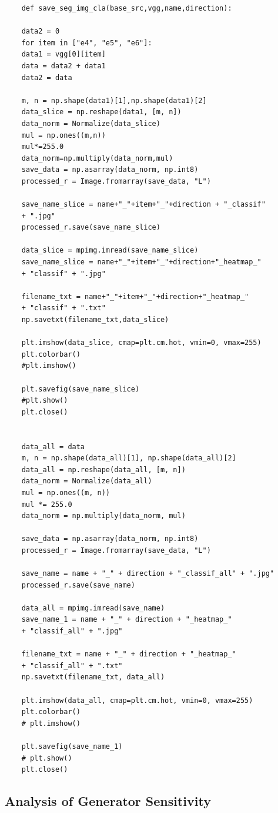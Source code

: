 \documentclass[a4paper]{article}
\begin{document}
	\lstset{language=python}
	\begin{lstlisting}
	def save_seg_img_cla(base_src,vgg,name,direction):
	
	data2 = 0
	for item in ["e4", "e5", "e6"]:  
	data1 = vgg[0][item]
	data = data2 + data1             	
	data2 = data
	
	m, n = np.shape(data1)[1],np.shape(data1)[2]
	data_slice = np.reshape(data1, [m, n])
	data_norm = Normalize(data_slice)
	mul = np.ones((m,n))
	mul*=255.0
	data_norm=np.multiply(data_norm,mul)
	save_data = np.asarray(data_norm, np.int8)
	processed_r = Image.fromarray(save_data, "L")
	
	save_name_slice = name+"_"+item+"_"+direction + "_classif" 
	+ ".jpg"
	processed_r.save(save_name_slice)
	
	data_slice = mpimg.imread(save_name_slice)
	save_name_slice = name+"_"+item+"_"+direction+"_heatmap_" 
	+ "classif" + ".jpg"
	
	filename_txt = name+"_"+item+"_"+direction+"_heatmap_" 
	+ "classif" + ".txt"
	np.savetxt(filename_txt,data_slice)
	
	plt.imshow(data_slice, cmap=plt.cm.hot, vmin=0, vmax=255)
	plt.colorbar()
	#plt.imshow()
	
	plt.savefig(save_name_slice)
	#plt.show()
	plt.close()
	

	data_all = data
	m, n = np.shape(data_all)[1], np.shape(data_all)[2]
	data_all = np.reshape(data_all, [m, n])
	data_norm = Normalize(data_all)
	mul = np.ones((m, n))
	mul *= 255.0
	data_norm = np.multiply(data_norm, mul)
	
	save_data = np.asarray(data_norm, np.int8)
	processed_r = Image.fromarray(save_data, "L")
	
	save_name = name + "_" + direction + "_classif_all" + ".jpg"
	processed_r.save(save_name)
	
	data_all = mpimg.imread(save_name)
	save_name_1 = name + "_" + direction + "_heatmap_" 
	+ "classif_all" + ".jpg"
	
	filename_txt = name + "_" + direction + "_heatmap_" 
	+ "classif_all" + ".txt"
	np.savetxt(filename_txt, data_all)
	
	plt.imshow(data_all, cmap=plt.cm.hot, vmin=0, vmax=255)
	plt.colorbar()
	# plt.imshow()
	
	plt.savefig(save_name_1)
	# plt.show()
	plt.close()
	\end{lstlisting}\label{g1}
	

	\subsection{Analysis of Generator Sensitivity}
	
\end{document}
